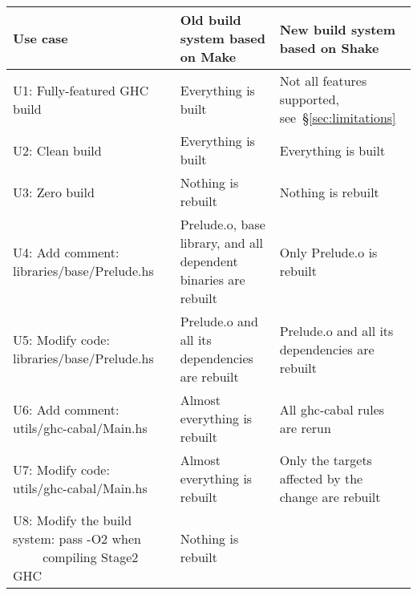 \newcommand{\checkedbox}{\makebox[0pt][l]{$\square$}\raisebox{.15ex}{\hspace{0.1em}$\checkmark$}}
\newcommand{\uncheckedbox}{\makebox[0pt][l]{$\square$}\raisebox{.15ex}{\hspace{0.92em}}}
\begin{table*}[t]
\centering
\begin{tabular}{p{60mm} || p{50mm} | p{50mm}}
\textbf{Use case}
& \textbf{Old build system} based on Make
& \textbf{New build system} based on Shake
\\
\hline
\textsf{U1:} Fully-featured GHC build
& Everything is built \hfill \checkedbox
& Not all features supported, see~\S\ref{sec:limitations} \hfill \uncheckedbox
\\
\textsf{U2:} Clean build
& Everything is built \hfill \checkedbox
& Everything is built \hfill \checkedbox
\\
\textsf{U3:} Zero build \hspace{6.4mm}
& Nothing is rebuilt \hfill \checkedbox
& Nothing is rebuilt \hfill \checkedbox
\\
\hline
\textsf{U4:} Add comment: \textsf{libraries/base/Prelude.hs}
& \textsf{Prelude.o}, \textsf{base} library, and all \hfill \uncheckedbox
\newline dependent binaries are rebuilt 
& Only \textsf{Prelude.o} is rebuilt \hfill \checkedbox
\\
\textsf{U5:} Modify code: \hspace{1.75mm}\textsf{libraries/base/Prelude.hs}
& \textsf{Prelude.o} and all its dependencies \hfill \checkedbox \newline
are rebuilt
& \textsf{Prelude.o} and all its dependencies \hfill \checkedbox \newline
are rebuilt
\\
\textsf{U6:} Add comment: \textsf{utils/ghc-cabal/Main.hs}
& Almost everything is rebuilt \hfill \uncheckedbox
& All \textsf{ghc-cabal} rules are rerun \hfill \uncheckedbox
\\
\textsf{U7:} Modify code: \hspace{1.75mm}\textsf{utils/ghc-cabal/Main.hs}
& Almost everything is rebuilt \hfill \uncheckedbox
& Only the targets affected by the \hfill \checkedbox \newline change are rebuilt
\\
\hline
\textsf{U8:} Modify the build system: pass \textsf{-O2} when \newline
$\textit{~~~~~~~}$compiling Stage2 GHC
& Nothing is rebuilt \hfill \uncheckedbox

\end{tabular}
\end{table*}
